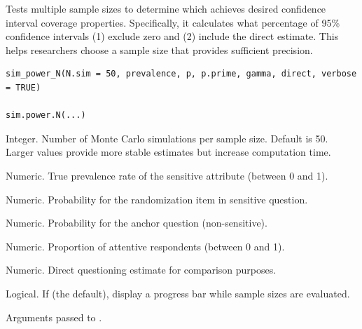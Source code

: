 \documentclass[a4paper]{book}
\begin{document}
%
\begin{Description}
Tests multiple sample sizes to determine which achieves desired confidence
interval coverage properties. Specifically, it calculates what percentage of
95\% confidence intervals (1) exclude zero and (2) include the direct estimate.
This helps researchers choose a sample size that provides sufficient precision.
\end{Description}
%
\begin{Usage}
\begin{verbatim}
sim_power_N(N.sim = 50, prevalence, p, p.prime, gamma, direct, verbose = TRUE)

sim.power.N(...)
\end{verbatim}
\end{Usage}
%
\begin{Arguments}
\begin{ldescription}
\item[\code{N.sim}] Integer. Number of Monte Carlo simulations per sample size.
Default is 50. Larger values provide more stable estimates but increase
computation time.

\item[\code{prevalence}] Numeric. True prevalence rate of the sensitive attribute
(between 0 and 1).

\item[\code{p}] Numeric. Probability for the randomization item in sensitive question.

\item[\code{p.prime}] Numeric. Probability for the anchor question (non-sensitive).

\item[\code{gamma}] Numeric. Proportion of attentive respondents (between 0 and 1).

\item[\code{direct}] Numeric. Direct questioning estimate for comparison purposes.

\item[\code{verbose}] Logical. If  (the default), display a progress bar
while sample sizes are evaluated.

\item[\code{...}] Arguments passed to .
\end{ldescription}
\end{Arguments}
%
\end{document}
